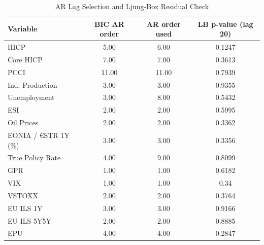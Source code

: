 \begin{table}[ht]
\centering
\begin{tabular}{lccc}
  \hline
Variable & BIC AR order & AR order used & LB p-value (lag 20) \\ 
  \hline
HICP & 5.00 & 6.00 & 0.1247 \\ 
  Core HICP & 7.00 & 7.00 & 0.3613 \\ 
  PCCI & 11.00 & 11.00 & 0.7939 \\ 
  Ind. Production & 3.00 & 3.00 & 0.9355 \\ 
  Unemployment & 3.00 & 8.00 & 0.5432 \\ 
  ESI & 2.00 & 2.00 & 0.5995 \\ 
  Oil Prices & 2.00 & 2.00 & 0.3362 \\ 
  EONIA / €STR 1Y (\%) & 3.00 & 3.00 & 0.3356 \\ 
  True Policy Rate & 4.00 & 9.00 & 0.8099 \\ 
  GPR & 1.00 & 1.00 & 0.6182 \\ 
  VIX & 1.00 & 1.00 & 0.34 \\ 
  VSTOXX & 2.00 & 2.00 & 0.3764 \\ 
  EU ILS 1Y & 3.00 & 3.00 & 0.9166 \\ 
  EU ILS 5Y5Y & 2.00 & 2.00 & 0.8885 \\ 
  EPU & 4.00 & 4.00 & 0.2847 \\ 
   \hline
\end{tabular}
\caption{AR Lag Selection and Ljung-Box Residual Check} 
\label{tab:ur_lag_selection}
\end{table}
